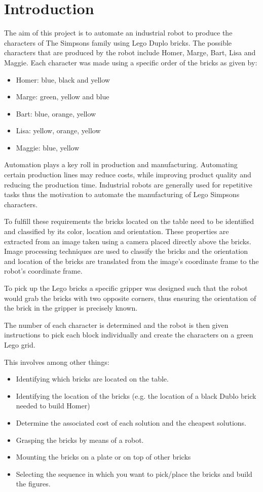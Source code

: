 \chapter{Introduction}\label{chap:introduction}
The aim of this project is to automate an industrial robot to produce the characters of The Simpsons family using Lego Duplo bricks. The possible characters that are produced by the robot include Homer, Marge, Bart, Lisa and Maggie. Each character was made using a specific order of the bricks as given by:

\begin{itemize}
	\item Homer: blue, black and yellow
	\item Marge: green, yellow and blue
	\item Bart: blue, orange, yellow
	\item Lisa: yellow, orange, yellow
	\item Maggie: blue, yellow
\end{itemize}

Automation plays a key roll in production and manufacturing. Automating certain production lines may reduce costs, while improving product quality and reducing the production time. Industrial robots are generally used for repetitive tasks thus the motivation to automate the manufacturing of Lego Simpsons characters.

To fulfill these requirements the bricks located on the table need to be identified and classified by its color, location and orientation. These properties are extracted from an image taken using a camera placed directly above the bricks. Image processing techniques are used to classify the bricks and the orientation and location of the bricks are translated from the image's coordinate frame to the robot's coordinate frame.

To pick up the Lego bricks a specific gripper was designed such that the robot would grab the bricks with two opposite corners, thus ensuring the orientation of the brick in the gripper is precisely known.

The number of each character is determined and the robot is then given instructions to pick each block individually and create the characters on a green Lego grid.


This involves among other things:
\begin{itemize}
    \item Identifying which bricks are located on the table.
    \item Identifying the location of the bricks (e.g. the location of a black Dublo brick needed to build Homer)
    \item Determine the associated cost of each solution and the cheapest solutions.
    \item Grasping the bricks by means of a robot.
    \item Mounting the bricks on a plate or on top of other bricks
    \item Selecting the sequence in which you want to pick/place the bricks and build the figures.
\end{itemize}